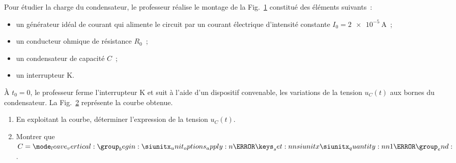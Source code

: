 Pour étudier la charge du condensateur, le professeur réalise le montage de la
Fig.~\ref{fig:svt_national_2016_normale_phys_ex2_1} constitué des éléments
suivants~:

\begin{itemize}
    \item un générateur idéal de courant qui alimente le circuit par un courant
          électrique d'intensité constante $I_{0}=\qty{2e-5}{\A}$~;
    \item un conducteur ohmique de résistance $R_{0}$~;
    \item un condensateur de capacité $C$~;
    \item un interrupteur $\mathrm{K}$.
\end{itemize}

À $t_{0}=0$, le professeur ferme l'interrupteur $\mathrm{K}$ et suit à l'aide
d'un dispositif convenable, les variations de la tension $u_{C}(t)$ aux bornes
du condensateur. La Fig.~\ref{fig:svt_national_2016_normale_phys_ex2_2}
représente la courbe obtenue.

\begin{minipage}{0.49\linewidth}
    \begin{figure}[H]
        \centering
        \caption{}
        \label{fig:svt_national_2016_normale_phys_ex2_1}
    \end{figure}
\end{minipage}
\begin{minipage}{0.49\linewidth}
\begin{figure}[H]
    \centering
    \caption{}
    \label{fig:svt_national_2016_normale_phys_ex2_2}
\end{figure}
\end{minipage}


\begin{enumerate}
    \item En exploitant la courbe, déterminer l'expression de la tension
          $u_{C}(t)$.
    \item \label{item:culcul_C}
          Montrer que $C=\qty{1}{\uF}$.
\end{enumerate}
